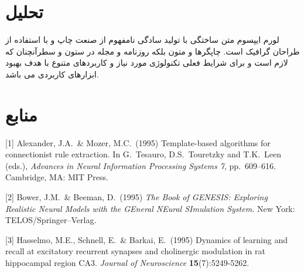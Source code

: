 \documentclass{article}
\begin{document}
\section{تحلیل}
لورم ایپسوم متن ساختگی با تولید سادگی نامفهوم از صنعت چاپ و با استفاده از طراحان گرافیک است. چاپگرها و متون بلکه روزنامه و مجله در ستون و سطرآنچنان که لازم است و برای شرایط فعلی تکنولوژی مورد نیاز و کاربردهای متنوع با هدف بهبود ابزارهای کاربردی می باشد.



\section*{منابع}

\medskip

\small
\LTR 
\latin

[1] Alexander, J.A.\ \& Mozer, M.C.\ (1995) Template-based algorithms for
connectionist rule extraction. In G.\ Tesauro, D.S.\ Touretzky and T.K.\ Leen
(eds.), {\it Advances in Neural Information Processing Systems 7},
pp.\ 609--616. Cambridge, MA: MIT Press.

[2] Bower, J.M.\ \& Beeman, D.\ (1995) {\it The Book of GENESIS: Exploring
  Realistic Neural Models with the GEneral NEural SImulation System.}  New York:
TELOS/Springer--Verlag.

[3] Hasselmo, M.E., Schnell, E.\ \& Barkai, E.\ (1995) Dynamics of learning and
recall at excitatory recurrent synapses and cholinergic modulation in rat
hippocampal region CA3. {\it Journal of Neuroscience} {\bf 15}(7):5249-5262.
\end{document}
